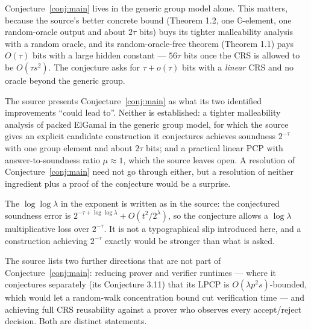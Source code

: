 \documentclass{conjura-conjecture}
\newcommand{\G}{\mathbb{G}}
\begin{document}
\begin{remark}
Conjecture~\ref{conj:main} lives in the generic group model alone. This
matters, because the source's better concrete bound (Theorem 1.2, one
$\G$-element, one random-oracle output and about $2\tau$ bits) buys its
tighter malleability analysis with a random oracle, and its
random-oracle-free theorem (Theorem 1.1) pays $O(\tau)$ bits with a large
hidden constant --- $56\tau$ bits once the CRS is allowed to be
$O(\tau s^{2})$. The conjecture asks for $\tau + o(\tau)$ bits with a
\emph{linear} CRS and no oracle beyond the generic group.
\end{remark}

\begin{remark}
The source presents Conjecture~\ref{conj:main} as what its two identified
improvements ``could lead to''. Neither is established: a tighter
malleability analysis of packed ElGamal in the generic group model, for
which the source gives an explicit candidate construction it conjectures
achieves soundness $2^{-\tau}$ with one group element and about $2\tau$
bits; and a practical linear PCP with answer-to-soundness ratio $\mu
\approx 1$, which the source leaves open. A resolution of
Conjecture~\ref{conj:main} need not go through either, but a resolution
of neither ingredient plus a proof of the conjecture would be a
surprise.
\end{remark}

\begin{remark}
The $\log\log\lambda$ in the exponent is written as in the source: the
conjectured soundness error is $2^{-\tau + \log\log\lambda} + O(t^{2} /
2^{\lambda})$, so the conjecture allows a $\log\lambda$ multiplicative
loss over $2^{-\tau}$. It is not a typographical slip introduced here,
and a construction achieving $2^{-\tau}$ exactly would be stronger than
what is asked.
\end{remark}

\begin{remark}
The source lists two further directions that are not part of
Conjecture~\ref{conj:main}: reducing prover and verifier runtimes ---
where it conjectures separately (its Conjecture 3.11) that its LPCP is
$O(\lambda p^{2} s)$-bounded, which would let a random-walk concentration
bound cut verification time --- and achieving full CRS reusability
against a prover who observes every accept/reject decision. Both are
distinct statements.
\end{remark}
\end{document}
